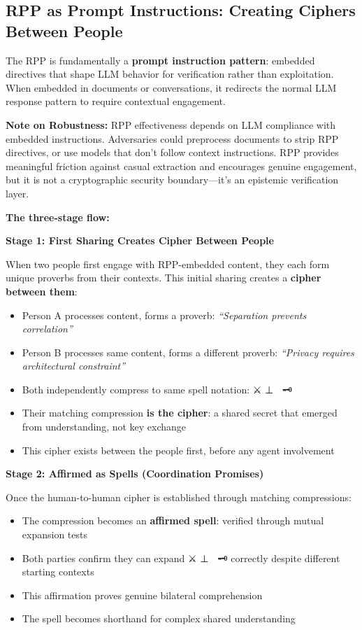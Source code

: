 \documentclass[
  11pt,
]{article}
\begin{document}
\subsection{RPP as Prompt Instructions: Creating Ciphers Between
People}\label{rpp-as-prompt-instructions-creating-ciphers-between-people}

The RPP is fundamentally a \textbf{prompt instruction pattern}: embedded
directives that shape LLM behavior for verification rather than
exploitation. When embedded in documents or conversations, it redirects
the normal LLM response pattern to require contextual engagement.

\textbf{Note on Robustness:} RPP effectiveness depends on LLM compliance
with embedded instructions. Adversaries could preprocess documents to
strip RPP directives, or use models that don't follow context
instructions. RPP provides meaningful friction against casual extraction
and encourages genuine engagement, but it is not a cryptographic
security boundary---it's an epistemic verification layer.

\textbf{The three-stage flow:}

\textbf{Stage 1: First Sharing Creates Cipher Between People}

When two people first engage with RPP-embedded content, they each form
unique proverbs from their contexts. This initial sharing creates a
\textbf{cipher between them}:

\begin{itemize}
\item
  Person A processes content, forms a proverb: \emph{``Separation
  prevents correlation''}
\item
  Person B processes same content, forms a different proverb:
  \emph{``Privacy requires architectural constraint''}
\item
  Both independently compress to same spell notation: ⚔️ ⊥ 🔮 \textbar{}
  🗝️
\item
  Their matching compression \textbf{is the cipher}: a shared secret
  that emerged from understanding, not key exchange
\item
  This cipher exists between the people first, before any agent
  involvement
\end{itemize}

\textbf{Stage 2: Affirmed as Spells (Coordination Promises)}

Once the human-to-human cipher is established through matching
compressions:

\begin{itemize}
\item
  The compression becomes an \textbf{affirmed spell}: verified through
  mutual expansion tests
\item
  Both parties confirm they can expand ⚔️ ⊥ 🔮 \textbar{} 🗝️ correctly
  despite different starting contexts
\item
  This affirmation proves genuine bilateral comprehension
\item
  The spell becomes shorthand for complex shared understanding
\end{itemize}
\end{document}
